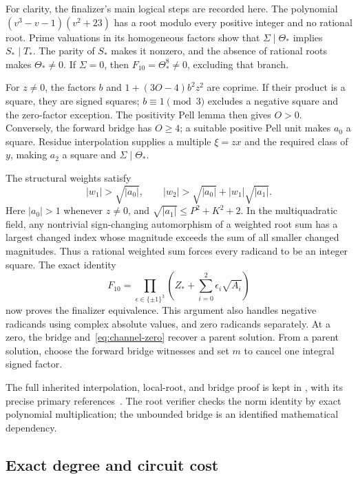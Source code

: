 For clarity, the finalizer's main logical steps are recorded here.
The polynomial \((v^3-v-1)(v^2+23)\) has a root modulo every positive
integer and no rational root.  Prime valuations in its homogeneous
factors show that \(\Sigma\mid\Theta_*\) implies \(S_*\mid T_*\).
The parity of \(S_*\) makes it nonzero, and the absence of rational
roots makes \(\Theta_*\ne0\).  If \(\Sigma=0\), then
\(F_{10}=\Theta_*^8\ne0\), excluding that branch.

For \(z\ne0\), the factors \(b\) and
\(1+(3O-4)b^2z^2\) are coprime.  If their product is a square,
they are signed squares; \(b\equiv1\pmod3\) excludes a negative
square and the zero-factor exception.  The positivity Pell lemma then
gives \(O>0\).  Conversely, the forward bridge has \(O\ge4\);
a suitable positive Pell unit makes \(a_0\) a square.  Residue
interpolation supplies a multiple \(\xi=zx\) and the required
class of \(y\), making \(a_2\) a square and
\(\Sigma\mid\Theta_*\).

The structural weights satisfy
\[
 |w_1|>\sqrt{|a_0|},\qquad
 |w_2|>\sqrt{|a_0|}+|w_1|\sqrt{|a_1|}.
\]
Here \(|a_0|>1\) whenever \(z\ne0\), and
\(\sqrt{|a_1|}\le P^2+K^2+2\).  In the multiquadratic field,
any nontrivial sign-changing automorphism of a weighted root sum has
a largest changed index whose magnitude exceeds the sum of all smaller
changed magnitudes.  Thus a rational weighted sum forces every radicand
to be an integer square.  The exact identity
\[
 F_{10}=\prod_{\epsilon\in\{\pm1\}^3}
 \left(Z_*+\sum_{i=0}^2\epsilon_i\sqrt{A_i}\right)
\]
now proves the finalizer equivalence.  This argument also handles
negative radicands using complex absolute values, and zero radicands
separately.  At a zero, the bridge and~\eqref{eq:channel-zero} recover
a parent solution.  From a parent solution, choose the forward bridge
witnesses and set \(m\) to cancel one integral signed factor.

The full inherited interpolation, local-root, and bridge proof is kept
in , with its precise primary
references~\cite{sun2021,sun2026}.  The root verifier checks the norm
identity by exact polynomial multiplication; the unbounded bridge is
an identified mathematical dependency.

\subsection{Exact degree and circuit cost}

